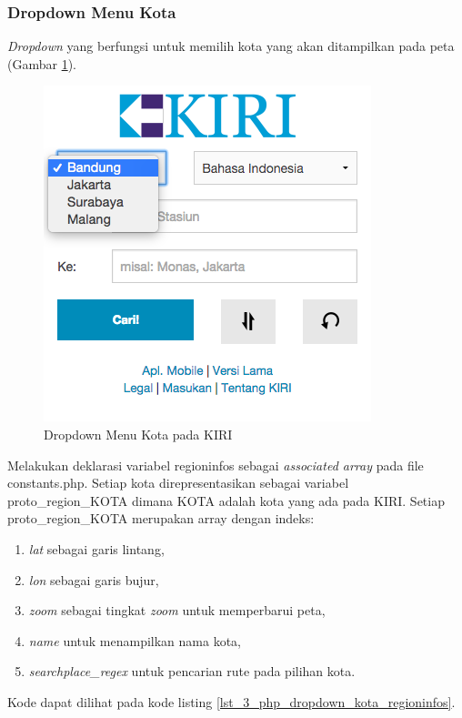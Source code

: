 \subsubsection{Dropdown Menu Kota}
\textit{Dropdown} yang berfungsi untuk memilih kota yang akan ditampilkan pada peta (Gambar \ref{fig:3_KIRI_drop_kota}).

\begin{figure}[H]
	\centering
	\includegraphics[scale=0.5]{Gambar/KIRI-drop-kota}
	\caption{Dropdown Menu Kota pada KIRI} 
	\label{fig:3_KIRI_drop_kota}
\end{figure}

Melakukan deklarasi variabel regioninfos sebagai \textit{associated array} pada file constants.php. Setiap kota direpresentasikan sebagai variabel proto\_region\_KOTA dimana KOTA adalah kota yang ada pada KIRI. Setiap proto\_region\_KOTA merupakan array dengan indeks:
\begin{enumerate}
	\item \textit{lat} sebagai garis lintang,
	\item \textit{lon} sebagai garis bujur,
	\item \textit{zoom} sebagai tingkat \textit{zoom} untuk memperbarui peta,
	\item \textit{name} untuk menampilkan nama kota,
	\item \textit{searchplace\_regex} untuk pencarian rute pada pilihan kota.
\end{enumerate} 
Kode dapat dilihat pada kode listing \ref{lst_3_php_dropdown_kota_regioninfos}.

